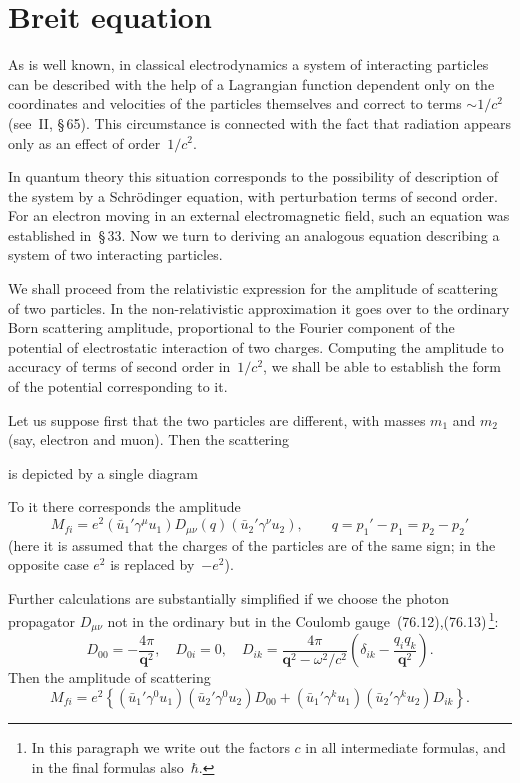 \section{Breit equation}

As is well known, in classical electrodynamics a system of interacting particles can be described with the help of a Lagrangian function dependent only on the coordinates and velocities of the particles themselves and correct to terms $\sim 1/c^2$ (see~II, \S\,65). This circumstance is connected with the fact that radiation appears only as an effect of order~$1/c^2$.

In quantum theory this situation corresponds to the possibility of description of the system by a Schr\"odinger equation, with perturbation terms of second order. For an electron moving in an external electromagnetic field, such an equation was established in~\S\,33. Now we turn to deriving an analogous equation describing a system of two interacting particles.

We shall proceed from the relativistic expression for the amplitude of scattering of two particles. In the non-relativistic approximation it goes over to the ordinary Born scattering amplitude, proportional to the Fourier component of the potential of electrostatic interaction of two charges. Computing the amplitude to accuracy of terms of second order in~$1/c^2$, we shall be able to establish the form of the potential corresponding to it.

Let us suppose first that the two particles are different, with masses $m_1$ and $m_2$ (say, electron and muon). Then the scattering

is depicted by a single diagram

To it there corresponds the amplitude
\begin{equation}
M_{fi} = e^2(\bar{u}_1'\gamma^\mu u_1)D_{\mu\nu}(q)(\bar{u}_2'\gamma^\nu u_2),\qquad q = p_1' - p_1 = p_2 - p_2'
\tag{83.1}
\end{equation}
(here it is assumed that the charges of the particles are of the same sign; in the opposite case $e^2$ is replaced by~$-e^2$).

Further calculations are substantially simplified if we choose the photon propagator $D_{\mu\nu}$ not in the ordinary but in the Coulomb gauge~(76.12),(76.13)\,\footnote{In this paragraph we write out the factors $c$ in all intermediate formulas, and in the final formulas also~$\hbar$.}:
\begin{equation}
D_{00} = -\frac{4\pi}{\mathbf{q}^2},\quad D_{0i} = 0,\quad D_{ik} = \frac{4\pi}{\mathbf{q}^2 - \omega^2/c^2}\left(\delta_{ik} - \frac{q_i q_k}{\mathbf{q}^2}\right).
\tag{83.2}
\end{equation}
Then the amplitude of scattering
\begin{equation}
M_{fi} = e^2\left\{(\bar{u}_1'\gamma^0 u_1)(\bar{u}_2'\gamma^0 u_2)D_{00} + (\bar{u}_1'\gamma^k u_1)(\bar{u}_2'\gamma^k u_2)D_{ik}\right\}.
\tag{83.3}
\end{equation}

